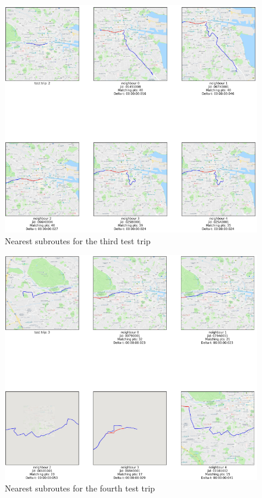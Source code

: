 \documentclass[12pt]{article}
\begin{document}
	\begin{figure} [H]
		\begin{center}
			\includegraphics [scale = 0.80] {subroutes3.png}
			\caption{Nearest subroutes for the third test trip}
		\end{center}
	\end{figure} 
	
	\begin{figure} [H]
		\begin{center}
			\includegraphics [scale = 0.80] {subroutes4.png}
			\caption{Nearest subroutes for the fourth test trip}
		\end{center}
	\end{figure} 
	
\end{document}
